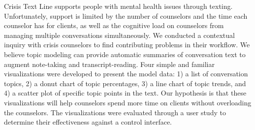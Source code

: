 % 
% 
%

Crisis Text Line supports people with mental health issues through texting.
Unfortunately, support is limited by the number of counselors and the time each counselor
has for clients, as well as the cognitive load on counselors from managing multiple
conversations simultaneously. We conducted a contextual inquiry with crisis
counselors to find contributing problems in their workflow. We believe topic modeling
can provide automatic summaries of conversation text to augment note-taking and
transcript-reading. Four simple and familiar visualizations were developed to present
the model data: 1) a list of conversation topics, 2) a donut chart of topic percentages,
3) a line chart of topic trends, and 4) a scatter plot of specific topic points in the text.
Our hypothesis is that these visualizations will help counselors spend more time on
clients without overloading the counselors. The visualizations were evaluated through
a user study to determine their effectiveness against a control interface.
